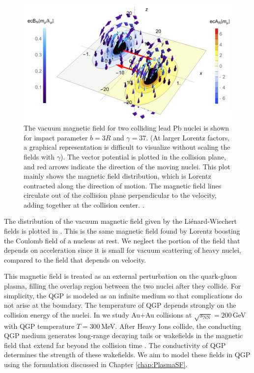 \begin{figure}[ht]
    \centering
    \includegraphics[width=0.85\linewidth]{plots/chap02QCD/Bfield.png}
    \caption{The vacuum magnetic field for two colliding lead Pb nuclei is shown for impact parameter $b=3R$ and $\gamma =37$. (At larger Lorentz factors, a graphical representation is difficult to visualize without scaling the fields with $\gamma$). The vector potential is plotted in the collision plane, and red arrows indicate the direction of the moving nuclei. This plot mainly shows the magnetic field distribution, which is Lorentz contracted along the direction of motion. The magnetic field lines circulate out of the collision plane perpendicular to the velocity, adding together at the collision center. .}
    \label{fig:vacmag}
\end{figure}

The distribution of the vacuum magnetic field given by the Li\'enard-Wiechert fields is plotted in . This is the same magnetic field found by Lorentz boosting the Coulomb field of a nucleus at rest. We neglect the portion of the field that depends on acceleration since it is small for vacuum scattering of heavy nuclei, compared to the field that depends on velocity.

This magnetic field is treated as an external perturbation on the quark-gluon plasma, filling the overlap region between the two nuclei after they collide. For simplicity, the QGP is modeled as an infinite medium so that complications do not arise at the boundary. The temperature of QGP depends strongly on the collision energy of the nuclei. In \cite{Grayson:2022asf} we study Au+Au collisions at $\sqrt{s_{\text{NN}}}=200\,$GeV with QGP temperature $T=300$\,MeV.  After Heavy Ions collide, the conducting QGP medium generates long-range decaying tails or wakefields in the magnetic field that extend far beyond the collision time \cite{Tuchin:2010vs}. The conductivity of QGP determines the strength of these wakefields. We aim to model these fields in QGP using the formulation discussed in Chapter \ref{chap:PlasmaSF}.

